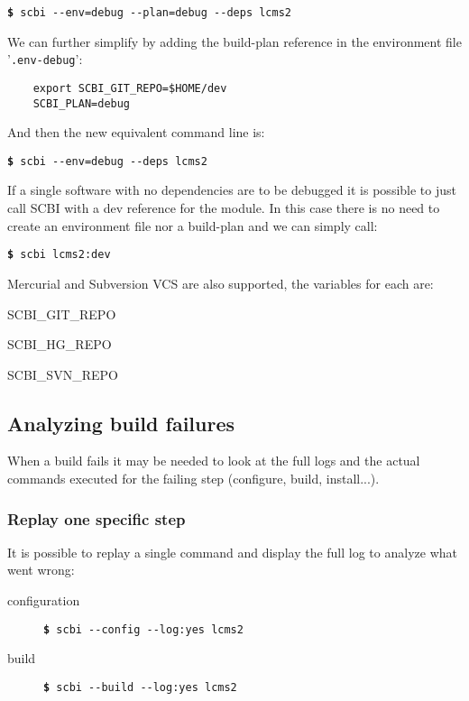\documentclass[a4paper,12pt,twoside]{article}
\newcommand{\file}[1]{'{\texttt{#1}}'}
\newcommand{\cmd}[1]{\tabto{1cm}\hspace{0.5cm}\texttt{\textbf{\$} #1}}
\newcommand{\ddash}{-{}-}
\begin{document}
\cmd{scbi \ddash{}env=debug \ddash{}plan=debug \ddash{}deps lcms2}

We can further simplify by adding the build-plan reference in the environment file \file{.env-debug}:

\begin{lstlisting}
	export SCBI_GIT_REPO=$HOME/dev
	SCBI_PLAN=debug
\end{lstlisting}

And then the new equivalent command line is:

\cmd{scbi \ddash{}env=debug \ddash{}deps lcms2}

If a single software with no dependencies are to be debugged it is possible to just call SCBI with a dev reference for the module. In this case there is no need to create an environment file nor a build-plan and we can simply call:

\cmd{scbi lcms2:dev}

Mercurial and Subversion VCS are also supported, the variables for each are:

\begin{description}[style=standard]
	\item[Git] \tabto{3cm} SCBI\_GIT\_REPO
	\item[Mercurial] \tabto{3cm} SCBI\_HG\_REPO
	\item[Subversion] \tabto{3cm} SCBI\_SVN\_REPO
\end{description}

\subsection{Analyzing build failures}
\label{debugging}

When a build fails it may be needed to look at the full logs and the actual commands executed for the failing step (configure, build, install...).

\subsubsection{Replay one specific step}

It is possible to replay a single command and display the full log to analyze what went wrong:

\begin{description}
	\item[configuration] \tabto{3cm}  \cmd{scbi \ddash{}config \ddash{}log:yes lcms2}
	\item[build] \tabto{3cm} \cmd{scbi \ddash{}build \ddash{}log:yes lcms2}
\end{description}
\end{document}

